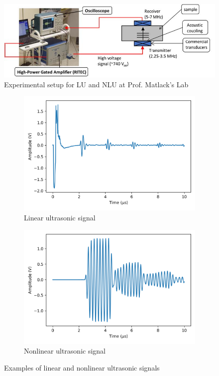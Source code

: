 \begin{figure}[tb]
  \includegraphics[width=\linewidth]{fig/ultrasound setup.png}
  \caption{Experimental setup for LU and NLU at Prof. Matlack's Lab}
  \label{fig: ultrasound setup}
\end{figure}

\begin{figure}[tb]
  \begin{subfigure}[t]{0.50\linewidth}
    \includegraphics[width=\textwidth]{fig/lu_signal_raw.png}
    \caption{Linear ultrasonic signal}
    \label{fig: lu signal raw}
  \end{subfigure}
  \begin{subfigure}[t]{0.50\linewidth}
    \includegraphics[width=\textwidth]{fig/nlu_singal_raw.png}
    \caption{Nonlinear ultrasonic signal}
    \label{fig: nlu signal raw}
  \end{subfigure}

  \caption{Examples of linear and nonlinear ultrasonic signals}
  \label{fig: lu and nlu signals raw}
\end{figure}

